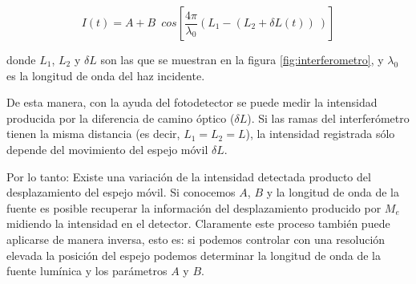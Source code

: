 \begin{equation}
I(t) = A + B \enspace cos\left[\frac{4 \pi}{\lambda_0} (L_1 - (L_2 + \delta L(t)) \ )\right]
\label{eq:prin}
\end{equation}

donde $L_1$, $L_2$ y $\delta L$ son las que se muestran en la figura \ref{fig:interferometro}, y $\lambda_0$ es la longitud de onda del haz incidente.

De esta manera, con la ayuda del fotodetector se puede medir la intensidad producida por la diferencia de camino óptico ($\delta L$).
Si las ramas del interferómetro tienen la misma distancia (es decir, $L_1 = L_2 = L$), la intensidad registrada sólo depende del movimiento del espejo móvil $\delta L$.

Por lo tanto: Existe una variación de la intensidad detectada producto del desplazamiento del espejo móvil. Si conocemos $A$, $B$ y la longitud de onda de la fuente es posible recuperar la información del desplazamiento producido por $M_e$ midiendo la intensidad en el detector. Claramente este proceso también puede aplicarse de manera inversa, esto es: si podemos controlar con una resolución elevada la posición del espejo podemos determinar la longitud de onda de la fuente lumínica y los parámetros $A$ y $B$.